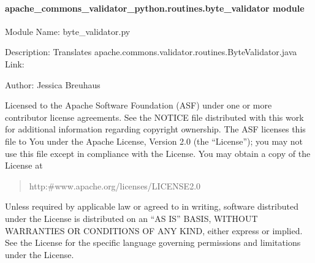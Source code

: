 \documentclass[letterpaper,10pt,english]{sphinxmanual}
\begin{document}
\paragraph{apache\_commons\_validator\_python.routines.byte\_validator module}
\label{\detokenize{apache_commons_validator_python.routines:module-apache_commons_validator_python.routines.byte_validator}}\label{\detokenize{apache_commons_validator_python.routines:apache-commons-validator-python-routines-byte-validator-module}}
\sphinxAtStartPar
Module Name: byte\_validator.py

\sphinxAtStartPar
Description: Translates apache.commons.validator.routines.ByteValidator.java
Link: 

\sphinxAtStartPar
Author: Jessica Breuhaus
\begin{description}
\sphinxAtStartPar
Licensed to the Apache Software Foundation (ASF) under one or more
contributor license agreements.  See the NOTICE file distributed with
this work for additional information regarding copyright ownership.
The ASF licenses this file to You under the Apache License, Version 2.0
(the “License”); you may not use this file except in compliance with
the License.  You may obtain a copy of the License at
\begin{quote}

\sphinxAtStartPar
http:\#www.apache.org/licenses/LICENSE\sphinxhyphen{}2.0
\end{quote}

\sphinxAtStartPar
Unless required by applicable law or agreed to in writing, software
distributed under the License is distributed on an “AS IS” BASIS,
WITHOUT WARRANTIES OR CONDITIONS OF ANY KIND, either express or implied.
See the License for the specific language governing permissions and
limitations under the License.

\end{description}
\end{document}
